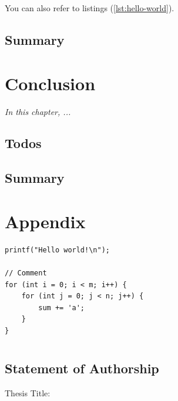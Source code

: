 \documentclass[
	12pt,
	a4paper,
	abstract,
	bibliography=totoc,
	chapterprefix,
	headings=openright,
	numbers=endperiod,
	parskip=half,
	twoside,
]{scrreprt}
\begin{document}
You can also refer to listings (\cref{lst:hello-world}).

\section*{Summary}

\lipsum[2]

\chapter{Conclusion}
\label{cha:conclusion}

\textit{In this chapter, ...}

\section{Todos}


\lipsum[1-2]

\section*{Summary}

\lipsum[2]





\appendix

\chapter{Appendix}
\label{cha:appendix}

\begin{lstlisting}[caption=Caption]
printf("Hello world!\n");

// Comment
for (int i = 0; i < m; i++) {
	for (int j = 0; j < n; j++) {
		sum += 'a';
	}
}
\end{lstlisting}

\chapter*{}

\section*{Statement of Authorship}

Thesis Title:

\bigskip
\bigskip
\end{document}
